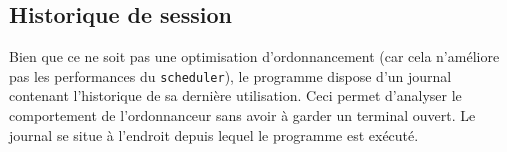     \subsection{Historique de session}
    
    Bien que ce ne soit pas une optimisation d'ordonnancement (car cela n'améliore pas les performances du \texttt{scheduler}), le programme dispose d'un journal contenant l'historique de sa dernière utilisation. Ceci permet d'analyser le comportement de l'ordonnanceur sans avoir à garder un terminal ouvert. Le journal se situe à l'endroit depuis lequel le programme est exécuté.